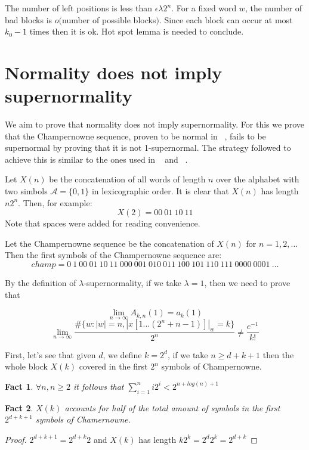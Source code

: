 \documentclass[11pt,a4paper]{tesis}
\newtheorem{fact}{Fact}[section]
\theoremstyle{definition}
\begin{document}
The number of left positions is less than $\epsilon\lambda2^n$. For a fixed word $w$, the number of bad blocks is $o($number of possible blocks$)$. Since each block can occur at most  $k_0 - 1$ times then it is ok.
Hot spot lemma  is needed to conclude.


\section{Normality does not imply supernormality}
We aim to prove that normality does not imply supernormality. For this we prove that the Champernowne sequence, proven to be normal in ~\cite{BC2018}, fails to be supernormal by proving that it is not 1-supernormal.
The strategy followed to achieve this is similar to the ones used in ~\cite{BCC2019} and  ~\cite{PS2019}.


Let $X(n)$ be the concatenation of all words of length $n$ over the alphabet with two simbols $\mathcal{A}=\{0,1\}$ in lexicographic order.  It is clear that $X(n)$ has length $n2^n$. Then, for example:
$$X(2) = 00 \: 01 \: 10 \: 11$$
Note that spaces were added for reading convenience.

Let the Champernowne sequence be the concatenation of $X(n)$ for $n = 1,2,\dots$ Then the first symbols of the Champernowne sequence are:
$$champ = 0 \: 1 \: 00 \: 01 \: 10 \: 11 \: 000 \: 001 \: 010 \: 011 \: 100 \: 101 \: 110 \: 111 \: 0000 \: 0001 \: \dots$$

By the definition of $\lambda$-supernormality, if we take $\lambda = 1$, then we need to prove that

$$\lim_{n\to\infty} A_{k,n}(1) = a_k(1)$$
$$\lim_{n\to\infty} \frac{\#\{w: |w| = n  , |x[1...(2^n+n-1)]|_w = k\}}{2^n} \neq \frac{e^{-1}}{k!}$$

\bigskip

First, let's see that given $d$, we define $k = 2^d$, if we take $n \geq d + k + 1$ then the whole block $X(k)$ covered in the first $2^n$ symbols of Champernowne.


\begin{fact}
    $\forall n, n  \geq 2$ it follows that $\sum_{i=1}^n i2^i < 2^{n + log(n) + 1}$ 
\end{fact}

\begin{fact} \label{p2}
    $X(k)$ accounts for half of the total amount of symbols in the first $2^{d+k+1}$ symbols of Chamernowne.
\end{fact}
\begin{proof}
    $2^{d+k+1} = 2^{d+k}2$ and $X(k)$ has length $k2^k = 2^d2^k = 2^{d+k}$ 
\end{proof}
\end{document}
